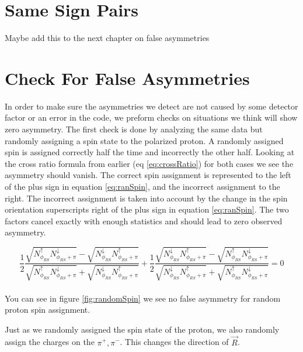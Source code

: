 \documentclass[abstract = on,listof=totoc, bibliography=totoc]{scrreprt}
\newcommand{\pip}{\pi^+}
\newcommand{\pim}{\pi^-}
\begin{document}
\section{Same Sign Pairs}
Maybe add this to the next chapter on false asymmetries

\section{Check For False Asymmetries}
In order to make sure the asymmetries we detect are not caused by some detector factor or an error in the code, we preform checks on situations we think will show zero asymmetry. The first check is done by analyzing the same data but randomly assigning a spin state to the polarized proton. A randomly assigned spin is assigned correctly half the time and incorrectly the other half. Looking at the cross ratio formula from earlier (eq \ref{eq:crossRatio}) for both cases we see the asymmetry should vanish. The correct spin assignment is represented to the left of the plus sign in equation \ref{eq:ranSpin}, and the incorrect assignment to the right. The incorrect assignment is taken into account by the change in the spin orientation superscripts right of the plus sign in equation \ref{eq:ranSpin}. The two factors cancel exactly with enough statistics and should lead to zero observed asymmetry. 

    

 
\begin{equation}
\label{eq:ranSpin}
\frac{1}{2}\frac{\sqrt{N^\uparrow_{\phi_{RS}}N^\downarrow_{\phi_{RS}+\pi}} - \sqrt{N^\downarrow_{\phi_{RS}}N^\uparrow_{\phi_{RS}+\pi}}}{\sqrt{N^\uparrow_{\phi_{RS}}N^\downarrow_{\phi_{RS}+\pi}} + \sqrt{N^\downarrow_{\phi_{RS}}N^\uparrow_{\phi_{RS}+\pi}}}
+
\frac{1}{2}\frac{\sqrt{N^\downarrow_{\phi_{RS}}N^\uparrow_{\phi_{RS}+\pi}} - \sqrt{N^\uparrow_{\phi_{RS}}N^\downarrow_{\phi_{RS}+\pi}}}{\sqrt{N^\downarrow_{\phi_{RS}}N^\uparrow_{\phi_{RS}+\pi}} + \sqrt{N^\uparrow_{\phi_{RS}}N^\downarrow_{\phi_{RS}+\pi}}} = 0
\end{equation}\\
%
You can see in figure \ref{fig:randomSpin} we see no false asymmetry for random proton spin assignment. 

Just as we randomly assigned the spin state of the proton, we also randomly assign the charges on the $\pip,\pim$. This changes the direction of $\vec{R}$. 
\end{document}
